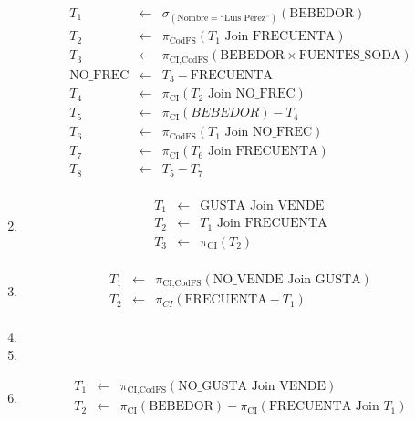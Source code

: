 \documentclass[12pt]{article}
\newcommand{\asig}{\ensuremath{\leftarrow}}
\begin{document}
\begin{enumerate}
\begin{eqnarray*}
 T_1 & \asig & \sigma_{(\text{Nombre}=\text{``Luis Pérez''})}(\text{BEBEDOR}) \\
 T_2 & \asig & \pi_{\text{CodFS}}(T_1 \text{ Join } \text{FRECUENTA}) \\ %
 T_3 & \asig & \pi_{\text{CI,CodFS}}(\text{BEBEDOR} \times \text{FUENTES\_SODA}) \\
 \text{NO\_FREC} & \asig & T_3 - \text{FRECUENTA} \\ %
 T_4 & \asig & \pi_{\text{CI}}(T_2 \text{ Join } \text{NO\_FREC}) \\ %
 T_5 & \asig & \pi_{\text{CI}}(BEBEDOR) - T_4 \\
 T_6 & \asig & \pi_{\text{CodFS}}(T_1 \text{ Join } \text{NO\_FREC}) \\ %
 T_7 & \asig & \pi_{\text{CI}}(T_6 \text{ Join } \text{FRECUENTA}) \\ %
 T_8 & \asig & T_5 - T_7 \\
\end{eqnarray*}

 \item 

\begin{eqnarray*}
 T_1 & \asig & \text{GUSTA} \text{ Join } \text{VENDE} \\
 T_2 & \asig & T_1 \text{ Join } \text{FRECUENTA} \\
 T_3 & \asig & \pi_{\text{CI}}(T_2) \\
\end{eqnarray*}

 \item 

\begin{eqnarray*}
 T_1 & \asig & \pi_{\text{CI,CodFS}}(\text{NO\_VENDE} \text{ Join } \text{GUSTA}) \\
 T_2 & \asig & \pi_{CI}(\text{FRECUENTA}-T_1) \\
\end{eqnarray*}

 \item 

 \item 

 \item 

\begin{eqnarray*}
 T_1 & \asig & \pi_{\text{CI,CodFS}}(\text{NO\_GUSTA} \text{ Join } \text{VENDE}) \\
 T_2 & \asig & \pi_{\text{CI}}(\text{BEBEDOR}) - \pi_{\text{CI}}(\text{FRECUENTA} \text{ Join } T_1) \\
\end{eqnarray*}


\end{enumerate}
\end{document}
